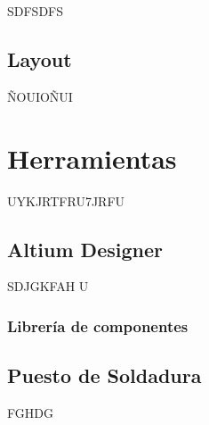 SDFSDFS

\subsection{Layout}

ÑOUIOÑUI


\section{Herramientas}
\label{diseno:sec:herramientas}


UYKJRTFRU7JRFU


\subsection{Altium Designer}

SDJGKFAH U

\subsubsection{Librería de componentes}


\subsection{Puesto de Soldadura}

FGHDG 

